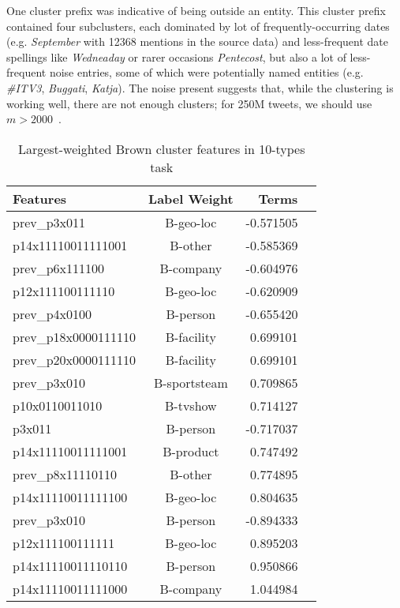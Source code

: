 \documentclass[11pt|a4paper]{article}
\begin{document}
One cluster prefix was indicative of being outside an entity.
This cluster prefix contained four subclusters, each dominated by lot of frequently-occurring dates (e.g. {\em September} with 12368 mentions in the source data) and less-frequent date spellings like {\em Wedneaday} or rarer occasions {\em Pentecost}, but also a lot of less-frequent noise entries, some of which were potentially named entities (e.g. {\em \#ITV3}, {\em Buggati}, {\em  Katja}).
The noise present suggests that, while the clustering is working well, there are not enough clusters; for 250M tweets, we should use $m>2000$~\cite{derczynski2015brown}.

\begin{table}
\centering
\footnotesize
\begin{tabular}{lcrl}
\hline
{\bf Features}  & {\bf Label} {\bf Weight} & {\bf Terms} \\
\hline
 prev\_p3x011 & B-geo-loc & -0.571505\\ 
 p14x11110011111001 & B-other & -0.585369\\ 
 prev\_p6x111100 & B-company & -0.604976\\ 
 p12x111100111110 & B-geo-loc & -0.620909\\ 
 prev\_p4x0100 & B-person & -0.655420\\ 
 prev\_p18x0000111110 & B-facility & 0.699101\\ 
 prev\_p20x0000111110 & B-facility & 0.699101\\ 
 prev\_p3x010 & B-sportsteam & 0.709865\\ 
 p10x0110011010 & B-tvshow & 0.714127\\ 
 p3x011 & B-person & -0.717037\\ 
 p14x11110011111001 & B-product & 0.747492\\ 
 prev\_p8x11110110 & B-other & 0.774895\\ 
 p14x11110011111100 & B-geo-loc & 0.804635\\ 
 prev\_p3x010 & B-person & -0.894333\\ 
 p12x111100111111 & B-geo-loc & 0.895203\\ 
 p14x11110011110110 & B-person & 0.950866\\ 
 p14x11110011111000 & B-company & 1.044984\\ 
\hline
\end{tabular}
\caption{Largest-weighted Brown cluster features in 10-types task}
\label{tab:strong-brown-feats}
\end{table}
\end{document}
